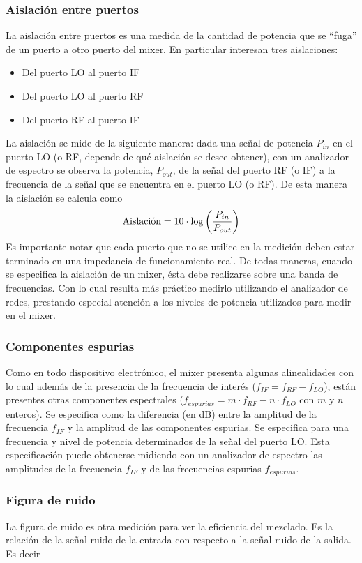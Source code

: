 \documentclass[a4paper,10pt]{article}
\begin{document}
		\subsubsection{Aislación entre puertos}
		La aislación entre puertos es una medida de la cantidad de potencia que se ``fuga'' de un puerto a otro puerto del mixer.
		En particular interesan tres aislaciones:
		\begin{itemize}
		\item Del puerto LO al puerto IF
		\item Del puerto LO al puerto RF
		\item Del puerto RF al puerto IF
		\end{itemize}
		La aislaci\'on se mide de la siguiente manera: dada una se\~nal de potencia $P_{in}$ en el puerto LO (o RF, depende de qu\'e aislaci\'on se desee obtener), con un analizador de espectro se observa la potencia, $P_{out}$, de la señal del puerto RF (o IF) a la frecuencia de la señal que se encuentra en el puerto LO (o RF). De esta manera la aislaci\'on se calcula como		$$\textmd{Aislaci\'on}=10\cdot\log\left(\frac{P_{in}}{P_{out}}\right)$$
		Es importante notar que cada puerto que no se utilice en la medici\'on deben estar terminado en una impedancia de funcionamiento real.
		De todas maneras, cuando se especifica la aislaci\'on de un mixer, \'esta debe realizarse sobre una banda de frecuencias. Con lo cual resulta m\'as pr\'actico medirlo utilizando el analizador de redes, prestando especial atenci\'on a los niveles de potencia utilizados para medir en el mixer.
		\subsubsection{Componentes espurias}
		Como en todo dispositivo electr\'onico, el mixer presenta algunas alinealidades con lo cual adem\'as de la presencia de la frecuencia de inter\'es ($f_{IF}=f_{RF}-f_{LO}$), est\'an presentes otras componentes espectrales ($f_{espurias}=m\cdot f_{RF}-n\cdot f_{LO}$ con $m$ y $n$ enteros). Se especifica como la diferencia (en dB) entre la amplitud de la frecuencia $f_{IF}$ y la amplitud de las componentes espurias. Se especifica para una frecuencia y nivel de potencia determinados de la señal del puerto LO.
		Esta especificaci\'on puede obtenerse midiendo con un analizador de espectro las amplitudes de la frecuencia $f_{IF}$ y de las frecuencias espurias $f_{espurias}$.
		
		\subsubsection{Figura de ruido}
		\indent La figura de ruido es otra medición para ver la eficiencia del 
		mezclado. Es la relación de la señal ruido de la entrada con respecto a
		la señal ruido de la salida. Es decir
		
\end{document}
